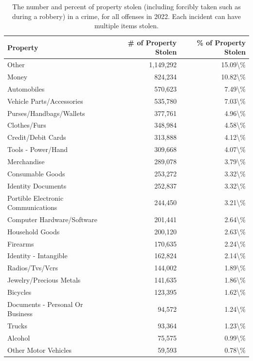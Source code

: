 \documentclass[
  12pt,
  openany]{book}
\begin{document}
\begin{longtable}[t]{lrr}
\caption{\label{tab:propertyStolenDescription}The number and percent of property stolen (including forcibly taken such as during a robbery) in a crime, for all offenses in 2022. Each incident can have multiple items stolen.}\\
\toprule
Property & \# of Property Stolen & \% of Property Stolen\\
\midrule
Other & 1,149,292 & 15.09\textbackslash{}\%\\
Money & 824,234 & 10.82\textbackslash{}\%\\
Automobiles & 570,623 & 7.49\textbackslash{}\%\\
Vehicle Parts/Accessories & 535,780 & 7.03\textbackslash{}\%\\
Purses/Handbags/Wallets & 377,761 & 4.96\textbackslash{}\%\\
\addlinespace
Clothes/Furs & 348,984 & 4.58\textbackslash{}\%\\
Credit/Debit Cards & 313,888 & 4.12\textbackslash{}\%\\
Tools - Power/Hand & 309,668 & 4.07\textbackslash{}\%\\
Merchandise & 289,078 & 3.79\textbackslash{}\%\\
Consumable Goods & 253,272 & 3.32\textbackslash{}\%\\
\addlinespace
Identity Documents & 252,837 & 3.32\textbackslash{}\%\\
Portible Electronic Communications & 244,450 & 3.21\textbackslash{}\%\\
Computer Hardware/Software & 201,441 & 2.64\textbackslash{}\%\\
Household Goods & 200,120 & 2.63\textbackslash{}\%\\
Firearms & 170,635 & 2.24\textbackslash{}\%\\
\addlinespace
Identity - Intangible & 162,824 & 2.14\textbackslash{}\%\\
Radios/Tvs/Vcrs & 144,002 & 1.89\textbackslash{}\%\\
Jewelry/Precious Metals & 141,635 & 1.86\textbackslash{}\%\\
Bicycles & 123,395 & 1.62\textbackslash{}\%\\
Documents - Personal Or Business & 94,572 & 1.24\textbackslash{}\%\\
\addlinespace
Trucks & 93,364 & 1.23\textbackslash{}\%\\
Alcohol & 75,575 & 0.99\textbackslash{}\%\\
Other Motor Vehicles & 59,593 & 0.78\textbackslash{}\%\\

\end{longtable}
\end{document}
